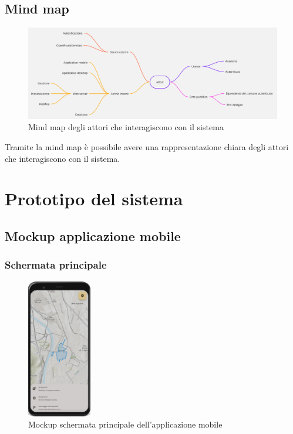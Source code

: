 \documentclass{article}
\begin{document}
\clearpage

\subsection{Mind map}

\begin{figure}[htbp]
    \label{fig:Mind_map}
    \centering
    \includegraphics[width=1\textwidth]{Images/BeeLive-MindMap.jpg}
    \caption{Mind map degli attori che interagiscono con il sistema}
\end{figure}

Tramite la mind map è possibile avere una rappresentazione chiara degli attori che interagiscono con il sistema.\\
\clearpage

\section{Prototipo del sistema}

\subsection{Mockup applicazione mobile}

\subsubsection{Schermata principale}
\begin{figure}[htbp]
    \label{fig:Schermata_principale_mobile}
    \centering
    \includegraphics[width=0.25\textwidth]{Images/Mockup1 - Mobile.png}
    \caption{Mockup schermata principale dell'applicazione mobile}
\end{figure}
\end{document}
